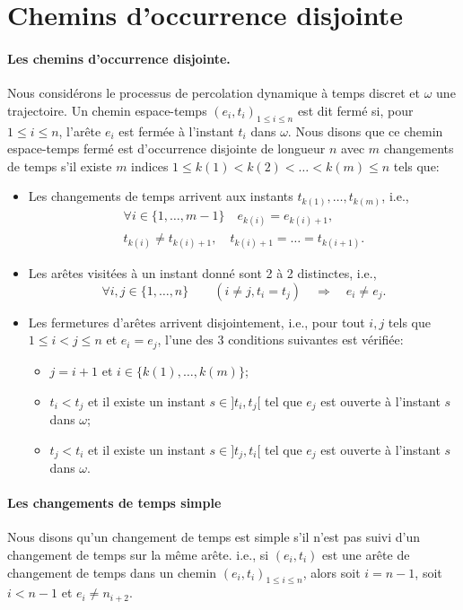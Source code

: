 \documentclass[titlepage,a4paper,12pt]{article}
\newcounter{d}
\newcounter{t}
\newcounter{p}
\newcounter{c}
\newcounter{a}
\newcounter{l}
\begin{document}
\section{Chemins d'occurrence disjointe}
\paragraph{Les chemins d'occurrence disjointe.}Nous considérons le processus de percolation dynamique à temps discret et $\omega$ une trajectoire. Un chemin espace-temps $(e_i,t_i)_{1\leqslant i \leqslant n}$ est dit fermé si, pour $1\leqslant i\leqslant n$, l'arête $e_i$ est fermée à l'instant $t_i$ dans $\omega$. Nous disons que ce chemin espace-temps fermé est d'occurrence disjointe de longueur $n$ avec $m$ changements de temps s'il existe $m$ indices $1\leqslant k(1)< k(2) < \dots < k(m) \leqslant n$ tels que:
\begin{itemize}[label = $\bullet$, leftmargin = *]
\item Les changements de temps arrivent aux instants $t_{k(1)},\dots, t_{k(m)}$, i.e.,
\begin{multline*}\forall i\in \{1,\dots, m-1\} \quad e_{k(i)} = e_{k(i)+1},\\ t_{k(i)} \neq t_{k(i)+1}, \quad t_{k(i)+1} =\dots = t_{k(i+1)}.
\end{multline*}
\item Les arêtes visitées à un instant donné sont 2 à 2 distinctes, i.e.,
$$ \forall i,j \in \{1,\dots, n\} \qquad (i\neq j, t_i = t_j)\quad \Rightarrow \quad e_i\neq e_j.
$$
\item Les fermetures d'arêtes arrivent disjointement, i.e., pour tout $i,j$ tels que $1\leqslant i<j \leqslant n$ et $e_i = e_j$, l'une des 3 conditions suivantes est vérifiée:
\begin{itemize}[label=$\diamond$]
\item $j=i+1$ et $i\in \{k(1),\dots, k(m)\}$;
\item $t_i< t_j$ et il existe un instant $s\in ]t_i,t_j[$ tel que $e_j$ est ouverte à l'instant $s$ dans $\omega$;
\item $t_j< t_i$ et il existe un instant $s\in ]t_j,t_i[$ tel que $e_j$ est ouverte à l'instant $s$ dans $\omega$.
\end{itemize}
\end{itemize}
\paragraph{Les changements de temps simple}
Nous disons qu'un changement de temps est simple s'il n'est pas suivi d'un changement de temps sur la même arête. i.e., si $(e_i,t_i)$ est une arête de changement de temps dans un chemin $(e_i,t_i)_{1\leqslant i \leqslant n}$, alors soit $i=n-1$, soit $i< n-1$ et $e_i \neq n_{i+2}$.
\end{document}
